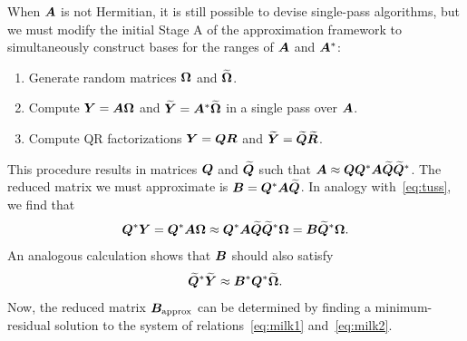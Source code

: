 \documentclass{article}
\begin{document}
When $\bm{A}$ is not Hermitian, it is still possible to devise
single-pass algorithms, but we must modify the initial Stage A
of the approximation framework to simultaneously construct bases
for the ranges of $\bm{A}$ and $\bm{A}^{*}$:
\lsp
\begin{enumerate}
\item   Generate random matrices $\bm{\Omega}$ and $\widetilde{\bm{\Omega}}$.
\item   Compute $\bm{Y} = \bm{A\Omega}$ and
$\widetilde{\bm{Y}} = \bm{A}^{*}\widetilde{\bm{\Omega}}$ in a single pass over $\bm{A}$.
\item   Compute QR factorizations $\bm{Y} = \bm{QR}$ and
$\widetilde{\bm{Y}} = \widetilde{\bm{Q}}\widetilde{\bm{R}}$.
\end{enumerate}
\lsp
This procedure results in matrices $\bm{Q}$ and $\widetilde{\bm{Q}}$ such that
$\bm{A} \approx \bm{QQ}^{*}\bm{A}\widetilde{\bm{Q}}\widetilde{\bm{Q}}^{*}$.
The reduced matrix we must approximate is
$\bm{B} = \bm{Q}^{*}\bm{A}\widetilde{\bm{Q}}$.
In analogy with~\eqref{eq:tuss}, we find that
\begin{equation}
\label{eq:milk1}
\bm{Q}^{*}\bm{Y} =
\bm{Q}^{*}\bm{A\Omega} \approx
\bm{Q}^{*}\bm{A}\widetilde{\bm{Q}}\widetilde{\bm{Q}}^{*}\bm{\Omega} =
\bm{B}\widetilde{\bm{Q}}^{*}\bm{\Omega}.
\end{equation}
An analogous calculation shows that $\bm{B}$ should also satisfy
\begin{equation}
\label{eq:milk2}
\widetilde{\bm{Q}}^{*}\widetilde{\bm{Y}} \approx \bm{B}^{*}\bm{Q}^{*}\widetilde{\bm{\Omega}}.
\end{equation}
Now, the reduced matrix $\bm{B}_{\rm approx}$ can be determined by finding a
minimum-residual solution to the system of relations~\eqref{eq:milk1} and~\eqref{eq:milk2}.

\lsp
\end{document}
